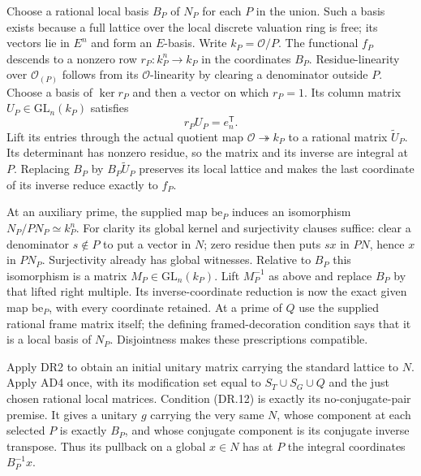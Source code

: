 Choose a rational local basis $B_P$ of $N_P$ for each $P$ in the
union. Such a basis exists because a full lattice over the local
discrete valuation ring is free; its vectors lie in $E^n$ and form
an $E$-basis. Write $k_P=\mathcal O/P$.
The functional $f_P$ descends to a nonzero row
$r_P:k_P^n\to k_P$ in the coordinates $B_P$.
Residue-linearity over $\mathcal O_{(P)}$ follows from its
$\mathcal O$-linearity by clearing a denominator outside $P$.
Choose a basis of $\ker r_P$ and then a vector on which $r_P=1$.
Its column matrix $U_P\in\mathrm{GL}_n(k_P)$ satisfies
\[
                         r_PU_P=e_n^{\mathsf T}.    \tag{DR.13}
\]
Lift its entries through the actual quotient map
$\mathcal O\twoheadrightarrow k_P$ to a rational matrix
$\widetilde U_P$. Its determinant has nonzero residue, so the
matrix and its inverse are integral at $P$. Replacing $B_P$ by
$B_P\widetilde U_P$ preserves its local lattice and makes the last
coordinate of its inverse reduce exactly to $f_P$.

At an auxiliary prime, the supplied map $\mathrm{be}_P$ induces
an isomorphism $N_P/PN_P\simeq k_P^n$.
For clarity its global kernel and surjectivity clauses suffice:
clear a denominator $s\notin P$ to put a vector in $N$;
zero residue then puts $sx$ in $PN$, hence $x$ in $PN_P$.
Surjectivity already has global witnesses. Relative to $B_P$ this
isomorphism is a matrix $M_P\in\mathrm{GL}_n(k_P)$.
Lift $M_P^{-1}$ as above and replace $B_P$ by that lifted
right multiple. Its inverse-coordinate reduction is now the exact
given map $\mathrm{be}_P$, with every coordinate retained.
At a prime of $Q$ use the supplied rational frame matrix itself;
the defining framed-decoration condition says that it is a local
basis of $N_P$. Disjointness makes these prescriptions compatible.

Apply DR2 to obtain an initial unitary matrix carrying the standard
lattice to $N$. Apply AD4 once, with its modification set equal to
$S_T\cup S_G\cup Q$ and the just chosen rational local matrices.
Condition (DR.12) is exactly its no-conjugate-pair premise.
It gives a unitary $g$ carrying the very same $N$, whose component
at each selected $P$ is exactly $B_P$, and whose conjugate component
is its conjugate inverse transpose. Thus its pullback on a global
$x\in N$ has at $P$ the integral coordinates $B_P^{-1}x$.


